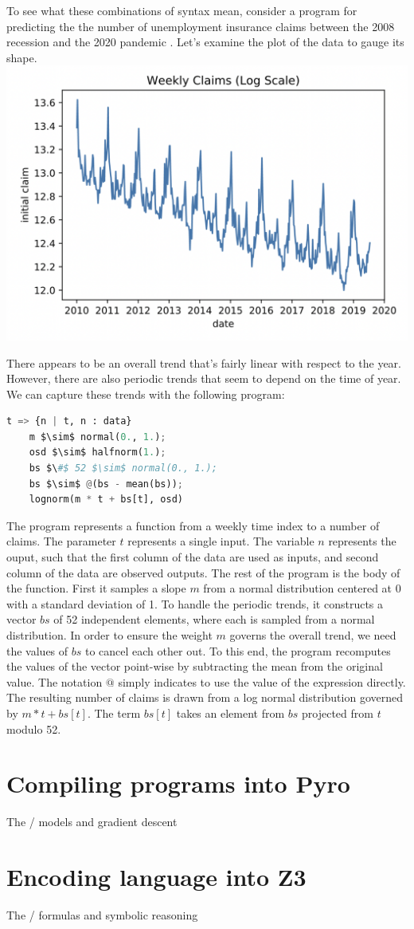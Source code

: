 \documentclass[runningheads]{llncs}
\begin{document}
To see what these combinations of syntax mean, consider a program
for predicting the the number of unemployment insurance claims 
between the 2008 recession and the 2020 pandemic \cite{}.
Let's examine the plot of the data to gauge its shape.
\newline
\includegraphics[scale=0.35]{weekly_claims}

There appears to be an overall trend that's fairly linear with respect to the year. 
However, there are also periodic trends that seem to depend on the time of year.  
We can capture these trends with the following program:

\begin{lstlisting}[language=Python]
t => {n | t, n : data}
    m $\sim$ normal(0., 1.); 
    osd $\sim$ halfnorm(1.); 
    bs $\#$ 52 $\sim$ normal(0., 1.); 
    bs $\sim$ @(bs - mean(bs));
    lognorm(m * t + bs[t], osd)
\end{lstlisting}

The program represents a function from a weekly time index to a number of claims.
The parameter $t$ represents a single input. The variable $n$ represents
the ouput, such that the first column of the data are used as inputs, 
and second column of the data are observed outputs.
The rest of the program is the body of the function.
First it samples a slope $m$ from a normal distribution centered at 0 with 
a standard deviation of 1. To handle the periodic trends, it constructs
a vector $bs$ of 52 independent elements, where each is sampled from 
a normal distribution. In order to ensure the weight $m$ governs
the overall trend, we need the values of $bs$ to cancel each other out.
To this end, the program recomputes the values of the vector point-wise 
by subtracting the mean from the original value. The notation $@$ simply indicates
to use the value of the expression directly.
The resulting number of claims is drawn from a log normal distribution
governed by $m * t + bs[t]$. The term $bs[t]$ takes an element from $bs$ 
projected from $t$ modulo 52. 



\section{Compiling programs into Pyro}
 The /  models and gradient descent

\section{Encoding language into Z3}
 The / formulas and symbolic reasoning  
\end{document}
